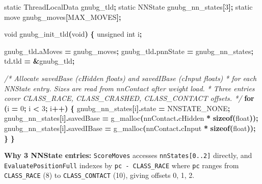 \documentclass[11pt,a4paper]{article}
\newenvironment{Shaded}{%
  \setlength{\FrameSep}{4pt}%
  \definecolor{shadecolor}{RGB}{245,245,245}%
  \begin{snugshade}\footnotesize
}{\end{snugshade}}
\newcommand{\CommentTok}[1]{\textcolor[rgb]{0.56,0.35,0.01}{\textit{#1}}}
\newcommand{\ControlFlowTok}[1]{\textcolor[rgb]{0.13,0.29,0.53}{\textbf{#1}}}
\newcommand{\DataTypeTok}[1]{\textcolor[rgb]{0.13,0.29,0.53}{#1}}
\newcommand{\DecValTok}[1]{\textcolor[rgb]{0.00,0.00,0.81}{#1}}
\newcommand{\KeywordTok}[1]{\textcolor[rgb]{0.13,0.29,0.53}{\textbf{#1}}}
\newcommand{\NormalTok}[1]{#1}
\newcommand{\OperatorTok}[1]{\textcolor[rgb]{0.81,0.36,0.00}{\textbf{#1}}}
\begin{document}
\begin{Shaded}
\begin{Highlighting}[]
\DataTypeTok{static}\NormalTok{ ThreadLocalData gnubg\_tld}\OperatorTok{;}
\DataTypeTok{static}\NormalTok{ NNState         gnubg\_nn\_states}\OperatorTok{[}\DecValTok{3}\OperatorTok{];}
\DataTypeTok{static}\NormalTok{ move            gnubg\_moves}\OperatorTok{[}\NormalTok{MAX\_MOVES}\OperatorTok{];}

\DataTypeTok{void}\NormalTok{ gnubg\_init\_tld}\OperatorTok{(}\DataTypeTok{void}\OperatorTok{)} \OperatorTok{\{}
    \DataTypeTok{unsigned} \DataTypeTok{int}\NormalTok{ i}\OperatorTok{;}

\NormalTok{    gnubg\_tld}\OperatorTok{.}\NormalTok{aMoves    }\OperatorTok{=}\NormalTok{ gnubg\_moves}\OperatorTok{;}
\NormalTok{    gnubg\_tld}\OperatorTok{.}\NormalTok{pnnState  }\OperatorTok{=}\NormalTok{ gnubg\_nn\_states}\OperatorTok{;}
\NormalTok{    td}\OperatorTok{.}\NormalTok{tld              }\OperatorTok{=} \OperatorTok{\&}\NormalTok{gnubg\_tld}\OperatorTok{;}

    \CommentTok{/* Allocate savedBase (cHidden floats) and savedIBase (cInput floats)}
\CommentTok{     * for each NNState entry. Sizes are read from nnContact after weight load.}
\CommentTok{     * Three entries cover CLASS\_RACE, CLASS\_CRASHED, CLASS\_CONTACT offsets. */}
    \ControlFlowTok{for} \OperatorTok{(}\NormalTok{i }\OperatorTok{=} \DecValTok{0}\OperatorTok{;}\NormalTok{ i }\OperatorTok{\textless{}} \DecValTok{3}\OperatorTok{;}\NormalTok{ i}\OperatorTok{++)} \OperatorTok{\{}
\NormalTok{        gnubg\_nn\_states}\OperatorTok{[}\NormalTok{i}\OperatorTok{].}\NormalTok{state     }\OperatorTok{=}\NormalTok{ NNSTATE\_NONE}\OperatorTok{;}
\NormalTok{        gnubg\_nn\_states}\OperatorTok{[}\NormalTok{i}\OperatorTok{].}\NormalTok{savedBase  }\OperatorTok{=}\NormalTok{ g\_malloc}\OperatorTok{(}\NormalTok{nnContact}\OperatorTok{.}\NormalTok{cHidden }\OperatorTok{*} \KeywordTok{sizeof}\OperatorTok{(}\DataTypeTok{float}\OperatorTok{));}
\NormalTok{        gnubg\_nn\_states}\OperatorTok{[}\NormalTok{i}\OperatorTok{].}\NormalTok{savedIBase }\OperatorTok{=}\NormalTok{ g\_malloc}\OperatorTok{(}\NormalTok{nnContact}\OperatorTok{.}\NormalTok{cInput  }\OperatorTok{*} \KeywordTok{sizeof}\OperatorTok{(}\DataTypeTok{float}\OperatorTok{));}
    \OperatorTok{\}}
\OperatorTok{\}}
\end{Highlighting}
\end{Shaded}

\textbf{Why 3 NNState entries:} \texttt{ScoreMoves} accesses
\texttt{nnStates{[}0..2{]}} directly, and \texttt{EvaluatePositionFull}
indexes by \texttt{pc\ -\ CLASS\_RACE} where \texttt{pc} ranges from
\texttt{CLASS\_RACE} (8) to \texttt{CLASS\_CONTACT} (10), giving offsets
0, 1, 2.
\end{document}
